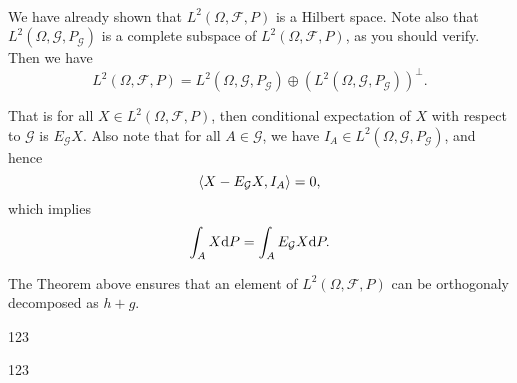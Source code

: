 \begin{theorem} \ \\
We have already shown that $L^2(\Omega,\mathcal{F},P)$ is a Hilbert space. Note also that $L^2(\Omega,\mathcal{G},P_{\mathcal{G}})$ is a complete  subspace of $L^2(\Omega,\mathcal{F},P)$, as you should verify. Then we have 
$$
L^2(\Omega,\mathcal{F},P) = L^2(\Omega,\mathcal{G},P_{\mathcal{G}}) \oplus (L^2(\Omega,\mathcal{G},P_{\mathcal{G}}))^{\perp}.
$$
\end{theorem}
That is for all $X \in L^2(\Omega,\mathcal{F},P)$, then conditional expectation of $X$ with respect to $\mathcal G$ is $E_\mathcal G X$. Also note that for all $A \in \mathcal G$, we have $I_A \in L^2(\Omega,\mathcal{G},P_{\mathcal{G}})$, and hence 
$$
{\langle X-E_\mathcal G X,I_A\rangle}=0,
$$
which implies 
$$
\int_A X \mathrm{d} P = \int_A E_\mathcal G X \mathrm{d} P.
$$




\begin{remark}
The Theorem above ensures that an element of $L^2(\Omega,\mathcal{F},P)$ can be orthogonaly decomposed as $h+g$.
\end{remark}

\begin{definition} 
	123
\end{definition}
\begin{definition}
	123
\end{definition}






